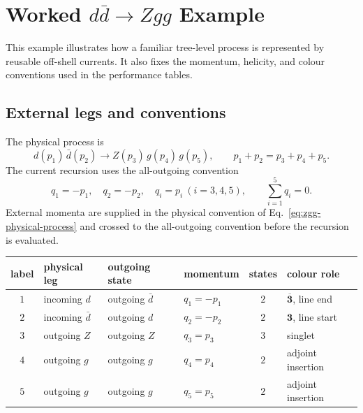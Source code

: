 \section{\texorpdfstring{Worked \(d\bar d\to Zgg\) Example}{Worked d dbar -> Z g g Example}}
\label{sec:zgg-example}

This example illustrates how a familiar tree-level process is represented by
reusable off-shell currents.  It also fixes the momentum, helicity, and colour
conventions used in the performance tables.

\subsection{External legs and conventions}

The physical process is
\begin{equation}
  d(p_1)\,\bar d(p_2) \longrightarrow Z(p_3)\,g(p_4)\,g(p_5),
  \qquad p_1+p_2=p_3+p_4+p_5 .
  \label{eq:zgg-physical-process}
\end{equation}
The current recursion uses the all-outgoing convention
\begin{equation}
  q_1=-p_1,\quad q_2=-p_2,\quad q_i=p_i\ (i=3,4,5),
  \qquad \sum_{i=1}^{5}q_i=0 .
  \label{eq:zgg-all-outgoing}
\end{equation}
External momenta are supplied in the physical convention of
Eq.~\eqref{eq:zgg-physical-process} and crossed to the all-outgoing convention
before the recursion is evaluated.

\begin{center}
\small
\begin{tabular}{@{}cL{0.90in}L{1.05in}L{1.00in}cL{1.35in}@{}}
\toprule
\textbf{label} & \textbf{physical leg} & \textbf{outgoing state} &
\textbf{momentum} & \textbf{states} & \textbf{colour role} \\
\midrule
$1$ & incoming $d$ & outgoing $\bar d$ & $q_1=-p_1$ & $2$ &
  $\overline{\mathbf 3}$, line end \\
$2$ & incoming $\bar d$ & outgoing $d$ & $q_2=-p_2$ & $2$ &
  $\mathbf 3$, line start \\
$3$ & outgoing $Z$ & outgoing $Z$ & $q_3=p_3$ & $3$ & singlet \\
$4$ & outgoing $g$ & outgoing $g$ & $q_4=p_4$ & $2$ & adjoint insertion \\
$5$ & outgoing $g$ & outgoing $g$ & $q_5=p_5$ & $2$ & adjoint insertion \\
\bottomrule
\end{tabular}
\end{center}

